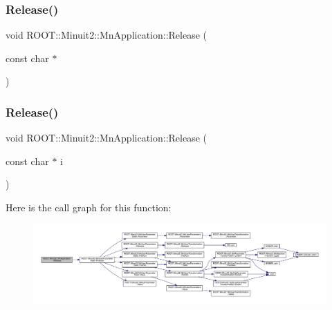 \subsubsection{\texorpdfstring{Release()}{Release()}\hspace{0.1cm}{\footnotesize\ttfamily [3/4]}}
{\footnotesize\ttfamily void R\+O\+O\+T\+::\+Minuit2\+::\+Mn\+Application\+::\+Release (\begin{DoxyParamCaption}\item[{const char $\ast$}]{ }\end{DoxyParamCaption})}

\mbox{\label{classROOT_1_1Minuit2_1_1MnApplication_a399bc86275d6ea481911be4a4b48d83c}} 
\subsubsection{\texorpdfstring{Release()}{Release()}\hspace{0.1cm}{\footnotesize\ttfamily [4/4]}}
{\footnotesize\ttfamily void R\+O\+O\+T\+::\+Minuit2\+::\+Mn\+Application\+::\+Release (\begin{DoxyParamCaption}\item[{const char $\ast$}]{i }\end{DoxyParamCaption})}

Here is the call graph for this function\+:\nopagebreak
\begin{figure}[H]
\begin{center}
\leavevmode
\includegraphics[width=350pt]{df/dd5/classROOT_1_1Minuit2_1_1MnApplication_a399bc86275d6ea481911be4a4b48d83c_cgraph}
\end{center}
\end{figure}
\mbox{\label{classROOT_1_1Minuit2_1_1MnApplication_a2c99043d2263ae51967867e1a26d4e30}} 
